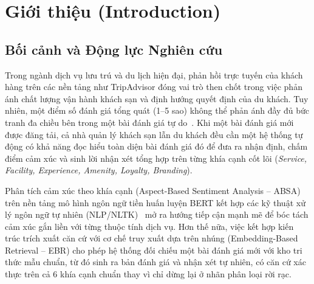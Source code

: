 \documentclass[pdflatex,sn-mathphys-num]{sn-jnl}
\theoremstyle{thmstyleone}
\theoremstyle{thmstyletwo}
\theoremstyle{thmstylethree}
\begin{document}

\maketitle

\section{Giới thiệu (Introduction)}
\label{sec:introduction}

\subsection{Bối cảnh và Động lực Nghiên cứu}
\label{subsec:background}
Trong ngành dịch vụ lưu trú và du lịch hiện đại, phản hồi trực tuyến của khách hàng trên các nền tảng như TripAdvisor đóng vai trò then chốt trong việc phản ánh chất lượng vận hành khách sạn và định hướng quyết định của du khách. Tuy nhiên, một điểm số đánh giá tổng quát (1--5 sao) không thể phản ánh đầy đủ bức tranh đa chiều bên trong một bài đánh giá tự do~\cite{namee2023hybrid}. Khi một bài đánh giá mới được đăng tải, cả nhà quản lý khách sạn lẫn du khách đều cần một hệ thống tự động có khả năng đọc hiểu toàn diện bài đánh giá đó để đưa ra nhận định, chấm điểm cảm xúc và sinh lời nhận xét tổng hợp trên từng khía cạnh cốt lõi (\textit{Service, Facility, Experience, Amenity, Loyalty, Branding}).

Phân tích cảm xúc theo khía cạnh (Aspect-Based Sentiment Analysis -- ABSA) trên nền tảng mô hình ngôn ngữ tiền huấn luyện BERT kết hợp các kỹ thuật xử lý ngôn ngữ tự nhiên (NLP/NLTK)~\cite{bimaputra2023aspect} mở ra hướng tiếp cận mạnh mẽ để bóc tách cảm xúc gắn liền với từng thuộc tính dịch vụ. Hơn thế nữa, việc kết hợp kiến trúc trích xuất căn cứ với cơ chế truy xuất dựa trên nhúng (Embedding-Based Retrieval -- EBR) cho phép hệ thống đối chiếu một bài đánh giá mới với kho tri thức mẫu chuẩn, từ đó sinh ra bản đánh giá và nhận xét tự nhiên, có căn cứ xác thực trên cả 6 khía cạnh chuẩn thay vì chỉ dừng lại ở nhãn phân loại rời rạc.
\end{document}
